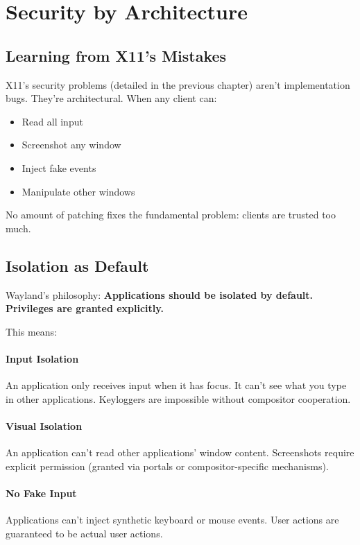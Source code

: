 \section{Security by Architecture}

\subsection{Learning from X11's Mistakes}

X11's security problems (detailed in the previous chapter) aren't implementation bugs. They're architectural. When any client can:
\begin{itemize}
    \item Read all input
    \item Screenshot any window
    \item Inject fake events
    \item Manipulate other windows
\end{itemize}

No amount of patching fixes the fundamental problem: clients are trusted too much.

\subsection{Isolation as Default}

Wayland's philosophy: \textbf{Applications should be isolated by default. Privileges are granted explicitly.}

This means:

\paragraph{Input Isolation}
An application only receives input when it has focus. It can't see what you type in other applications. Keyloggers are impossible without compositor cooperation.

\paragraph{Visual Isolation}
An application can't read other applications' window content. Screenshots require explicit permission (granted via portals or compositor-specific mechanisms).

\paragraph{No Fake Input}
Applications can't inject synthetic keyboard or mouse events. User actions are guaranteed to be actual user actions.

